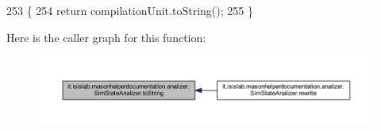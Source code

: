 \begin{DoxyCode}
253                             \{
254         \textcolor{keywordflow}{return} compilationUnit.toString();
255     \}
\end{DoxyCode}


Here is the caller graph for this function\-:\nopagebreak
\begin{figure}[H]
\begin{center}
\leavevmode
\includegraphics[width=350pt]{classit_1_1isislab_1_1masonhelperdocumentation_1_1analizer_1_1_sim_state_analizer_adc78b00761532b2b5cc84a075a1adc5f_icgraph}
\end{center}
\end{figure}





